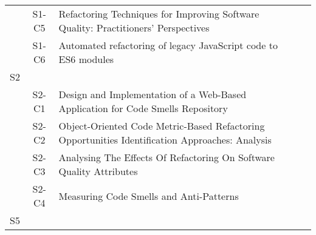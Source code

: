 \begin{longtable}{ccp{9cm}p{3cm}}
    & S1-C5   & Refactoring Techniques for Improving Software Quality: Practitioners’ Perspectives                                                                                                                                                             & \citeauthor*{Ksontini2021}    \\
    & S1-C6   & Automated refactoring of legacy JavaScript code to ES6 modules                                                                                                                                                                                 & \citeauthor*{Paltoglou2021}   \\
S2  &        &                                                                                                                                                                                                                                               &                                 \\
    & S2-C1   & Design and Implementation of a Web-Based Application for Code Smells Repository                                                                                                                                                                & \citeauthor*{Bamizadeh2021}   \\
    & S2-C2   & Object-Oriented Code Metric-Based Refactoring Opportunities Identification Approaches: Analysis                                                                                                                                                & \citeauthor*{Bassey2017}      \\
    & S2-C3   & Analysing The Effects Of Refactoring On Software Quality Attributes                                                                                                                                                                            & \citeauthor*{Singh2018a}       \\
    & S2-C4   & Measuring Code Smells and Anti-Patterns                                                                                                                                                                                                        & \citeauthor*{Reeshti2019}     \\
S5  &        &                                                                                                                                                                                                                                               &                                 \\

\end{longtable}
